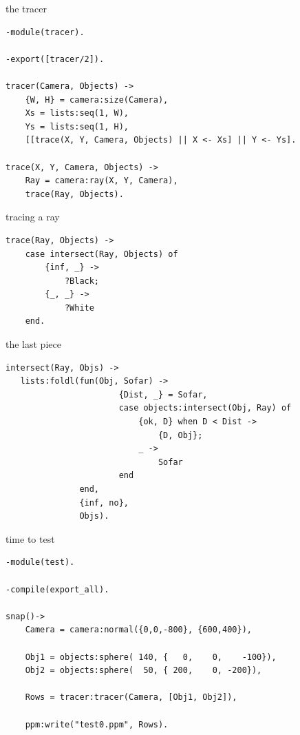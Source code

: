 \begin{frame}[fragile]{the tracer}

\begin{verbatim}
-module(tracer).

-export([tracer/2]).

tracer(Camera, Objects) ->
    {W, H} = camera:size(Camera),
    Xs = lists:seq(1, W),
    Ys = lists:seq(1, H),
    [[trace(X, Y, Camera, Objects) || X <- Xs] || Y <- Ys].

trace(X, Y, Camera, Objects) ->
    Ray = camera:ray(X, Y, Camera),
    trace(Ray, Objects).
\end{verbatim}

\end{frame}

\begin{frame}[fragile]{tracing a ray}

\begin{verbatim}
trace(Ray, Objects) ->
    case intersect(Ray, Objects) of
        {inf, _} ->
            ?Black;
        {_, _} -> 
            ?White
    end.
\end{verbatim}

\end{frame}

\begin{frame}[fragile]{the last piece}

\begin{verbatim}
intersect(Ray, Objs) ->
   lists:foldl(fun(Obj, Sofar) -> 
                       {Dist, _} = Sofar,
                       case objects:intersect(Obj, Ray) of
                           {ok, D} when D < Dist ->
                               {D, Obj};
                           _ ->
                               Sofar
                       end
               end,
               {inf, no},
               Objs).
\end{verbatim}

\end{frame}

\begin{frame}[fragile]{time to test}
\begin{verbatim}
-module(test).

-compile(export_all).

snap()->
    Camera = camera:normal({0,0,-800}, {600,400}),

    Obj1 = objects:sphere( 140, {   0,    0,    -100}),
    Obj2 = objects:sphere(  50, { 200,    0, -200}),

    Rows = tracer:tracer(Camera, [Obj1, Obj2]),

    ppm:write("test0.ppm", Rows).
\end{verbatim}
\end{frame}


